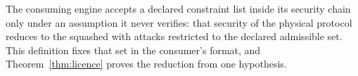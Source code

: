 
The consuming engine accepts a declared constraint list inside its security
chain only under an assumption it never verifies: that security of the
physical protocol reduces to the squashed  with attacks
restricted to the declared admissible set. This definition fixes that set in
the consumer's format, and Theorem~\ref{thm:licence} proves the reduction
from one hypothesis.

